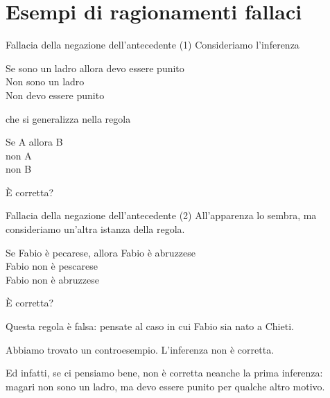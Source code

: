 \documentclass[10pt,dvipsnames,handout]{beamer}
\begin{document}
\section{Esempi di ragionamenti fallaci}

\begin{frame}{Fallacia della negazione dell'antecedente (1)}
	Consideriamo l'inferenza
	\begin{center}
		\begin{inference}
			Se sono un ladro allora devo essere punito\\
			Non sono un ladro\\
			\hline
			Non devo essere punito
		\end{inference}
	\end{center}
	che si generalizza nella regola
	\begin{center}
		\begin{inference}
			Se A allora B\\
			non A\\
			\hline
			non B
		\end{inference}
	\end{center}
	È corretta?
\end{frame}

\begin{frame}{Fallacia della negazione dell'antecedente (2)}
	All'apparenza lo sembra, ma consideriamo un'altra istanza della regola.
	\begin{center}
		\begin{inference}
			Se Fabio è pecarese, allora Fabio è abruzzese \only<3->{\checkmark}\\
			Fabio non è pescarese \only<4->{\checkmark}\\
			\hline
			Fabio non è abruzzese \only<5->{\xmark}
		\end{inference}
	\end{center}
	È corretta?

	\pause
	\medskip
	Questa regola è falsa: pensate al caso in cui Fabio sia nato a Chieti.

	\medskip
	Abbiamo trovato un \alert{controesempio}. L'inferenza non è corretta.

	\medskip
	Ed infatti, se ci pensiamo bene, non è corretta neanche la prima inferenza: magari non sono un ladro, ma devo essere punito per qualche altro motivo.
\end{frame}
\end{document}
